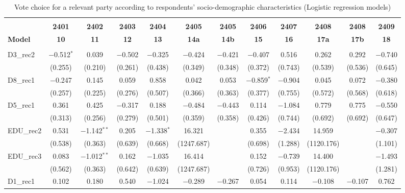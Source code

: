 \documentclass[
]{article}
\begin{document}
\begin{table}[!htbp] \centering 
  \caption{Vote choice for a relevant party according to respondents'
                       socio-demographic characteristics (Logistic regression models)} 
  \label{table:full_logit_si_p1} 
\footnotesize 
\begin{tabular}{@{\extracolsep{0.5pt}}lccccccccccc} 
\\[-1.8ex]\hline \\[-1.8ex] 
 & \textbf{2401} & \textbf{2402} & \textbf{2403} & \textbf{2404} & \textbf{2405} & \textbf{2405} & \textbf{2406} & \textbf{2407} & \textbf{2408} & \textbf{2408} & \textbf{2409} \\ 
\textbf{Model} & \textbf{10} & \textbf{11} & \textbf{12} & \textbf{13} & \textbf{14a} & \textbf{14b} & \textbf{15} & \textbf{16} & \textbf{17a} & \textbf{17b} & \textbf{18}\\ 
\hline \\[-1.8ex] 
 D3\_rec2 & $-$0.512$^{*}$ & 0.039 & $-$0.502 & $-$0.325 & $-$0.424 & $-$0.421 & $-$0.407 & 0.516 & 0.262 & 0.292 & $-$0.740 \\ 
  & (0.255) & (0.210) & (0.261) & (0.438) & (0.349) & (0.348) & (0.372) & (0.743) & (0.539) & (0.536) & (0.645) \\ 
  D8\_rec1 & $-$0.247 & 0.145 & 0.059 & 0.858 & 0.042 & 0.053 & $-$0.859$^{*}$ & $-$0.904 & 0.045 & 0.072 & $-$0.380 \\ 
  & (0.257) & (0.225) & (0.276) & (0.507) & (0.366) & (0.363) & (0.377) & (0.755) & (0.572) & (0.568) & (0.618) \\ 
  D5\_rec1 & 0.361 & 0.425 & $-$0.317 & 0.188 & $-$0.484 & $-$0.443 & 0.114 & $-$1.084 & 0.779 & 0.775 & $-$0.550 \\ 
  & (0.313) & (0.256) & (0.279) & (0.501) & (0.359) & (0.358) & (0.426) & (0.744) & (0.692) & (0.692) & (0.647) \\ 
  EDU\_rec2 & 0.531 & $-$1.142$^{**}$ & 0.205 & $-$1.338$^{*}$ & 16.321 &  & 0.355 & $-$2.434 & 14.959 &  & $-$0.307 \\ 
  & (0.538) & (0.363) & (0.639) & (0.668) & (1247.687) &  & (0.698) & (1.288) & (1120.176) &  & (1.101) \\ 
  EDU\_rec3 & 0.083 & $-$1.012$^{**}$ & 0.162 & $-$1.035 & 16.414 &  & 0.152 & $-$0.739 & 14.400 &  & $-$1.493 \\ 
  & (0.562) & (0.363) & (0.642) & (0.639) & (1247.687) &  & (0.726) & (0.953) & (1120.176) &  & (1.281) \\ 
  D1\_rec1 & 0.102 & 0.180 & 0.540 & $-$1.024 & $-$0.289 & $-$0.267 & 0.054 & 0.114 & $-$0.108 & $-$0.107 & 0.762 \\ 

\end{tabular}
\end{table}
\end{document}
